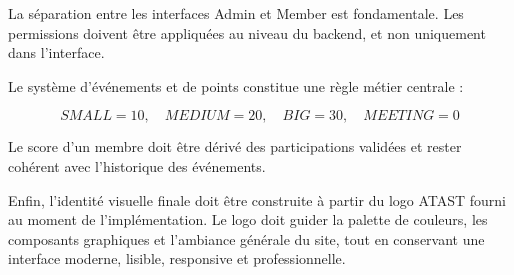 \documentclass[11pt,a4paper]{report}
\begin{document}
La séparation entre les interfaces Admin et Member est fondamentale. Les permissions doivent être appliquées au niveau du backend, et non uniquement dans l'interface.

Le système d'événements et de points constitue une règle métier centrale :

\[
\boxed{
SMALL=10,\quad
MEDIUM=20,\quad
BIG=30,\quad
MEETING=0
}
\]

Le score d'un membre doit être dérivé des participations validées et rester cohérent avec l'historique des événements.

Enfin, l'identité visuelle finale doit être construite à partir du logo ATAST fourni au moment de l'implémentation. Le logo doit guider la palette de couleurs, les composants graphiques et l'ambiance générale du site, tout en conservant une interface moderne, lisible, responsive et professionnelle.
\end{document}
